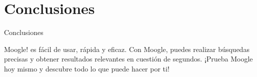 \documentclass{beamer}
\begin{document}
\section{Conclusiones}

\begin{frame}{Conclusiones}
    \begin{center}
        \large Moogle! es fácil de usar, rápida y eficaz. Con Moogle, puedes realizar búsquedas precisas y obtener resultados relevantes en cuestión de segundos. ¡Prueba Moogle hoy mismo y descubre todo lo que puede hacer por ti!
    \end{center}
\end{frame}
\end{document}
